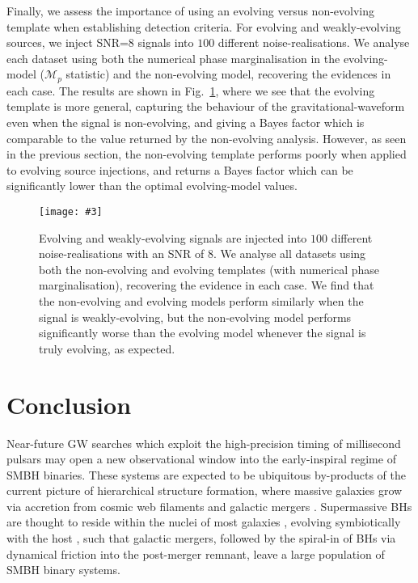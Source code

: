 \documentclass[twocolappendix,tighten]{emulateapj}
\newcommand{\incgraph}[3]{\texttt{[image: \#3]}}
\begin{document}
Finally, we assess the importance of using an evolving versus non-evolving template when establishing detection criteria. For evolving and weakly-evolving sources, we inject SNR=8 signals into $100$ different noise-realisations. We analyse each dataset using both the numerical phase marginalisation in the evolving-model ($\mathcal{M}_p$ statistic) and the non-evolving model, recovering the evidences in each case. The results are shown in Fig.\ \ref{fig:EvNonEv_BayesDiff}, where we see that the evolving template is more general, capturing the behaviour of the gravitational-waveform even when the signal is non-evolving, and giving a Bayes factor which is comparable to the value returned by the non-evolving analysis. However, as seen in the previous section, the non-evolving template performs poorly when applied to evolving source injections, and returns a Bayes factor which can be significantly lower than the optimal evolving-model values.

\begin{figure}
  \centering
  \incgraph{0}{0.5}{Evolve_NonEvolve_TemplateCompare.png}
   \caption{\label{fig:EvNonEv_BayesDiff}Evolving and weakly-evolving signals are injected into $100$ different noise-realisations with an SNR of $8$. We analyse all datasets using both the non-evolving and evolving templates (with numerical phase marginalisation), recovering the evidence in each case. We find that the non-evolving and evolving models perform similarly when the signal is weakly-evolving, but the non-evolving model performs significantly worse than the evolving model whenever the signal is truly evolving, as expected.} 
 \end{figure}

\section{Conclusion} \label{sec:singlesourceconclusions}

Near-future GW searches which exploit the high-precision timing of millisecond pulsars may open a new observational window into the early-inspiral regime of SMBH binaries. These systems are expected to be ubiquitous by-products of the current picture of hierarchical structure formation, where massive galaxies grow via accretion from cosmic web filaments and galactic mergers \citep{whiterees1978,kauffmann2000}. Supermassive BHs are thought to reside within the nuclei of most galaxies \citep[e.g.,][]{ferrarese2005}, evolving symbiotically with the host \citep[e.g.,][]{ferrarese2000,magorrian1998,marconi2003}, such that galactic mergers, followed by the spiral-in of BHs via dynamical friction into the post-merger remnant, leave a large population of SMBH binary systems.
\end{document}
